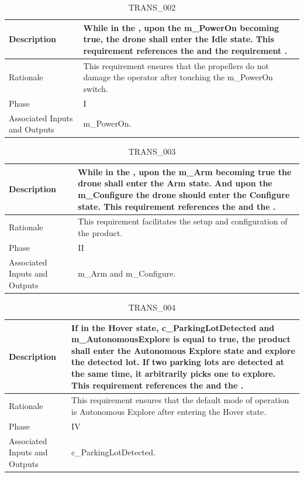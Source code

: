 \documentclass{article}
\begin{document}
\begin{table}[!h]
\begin{center}
\caption {TRANS\_002} 
\label{TRANS_002}
\begin{tabular}{ | m{3cm} | m{11cm} | }
\hline
Description & While in the \nameref{Off State}, upon the m\_PowerOn becoming true, the drone shall enter the Idle state. This requirement references the \nameref{Idle State} and the requirement \nameref{SAFE_005}. \\
\hline
Rationale & This requirement ensures that the propellers do not damage the operator after touching the m\_PowerOn switch.  \\
\hline
Phase & I \\
\hline
Associated Inputs and Outputs & m\_PowerOn. \\
\hline
\end{tabular}
\end{center}
\end{table}

\begin{table}[!h]
\begin{center}
\caption {TRANS\_003} 
\label{TRANS_003}
\begin{tabular}{ | m{3cm} | m{11cm} | }
\hline
Description & While in the \nameref{Idle State}, upon the m\_Arm becoming true the drone shall enter the Arm state. And upon the m\_Configure the drone should enter the Configure state. This requirement references the \nameref{Arm State} and the \nameref{Configure State}. \\
\hline
Rationale & This requirement facilitates the setup and configuration of the product.  \\
\hline
Phase & II \\
\hline
Associated Inputs and Outputs & m\_Arm and m\_Configure. \\
\hline
\end{tabular}
\end{center}
\end{table}

\begin{table}[!h]
\begin{center}
\caption {TRANS\_004} 
\label{TRANS_004}
\begin{tabular}{ | m{3cm} | m{11cm} | }
\hline
Description & If in the Hover state, c\_ParkingLotDetected and m\_AutonomousExplore is equal to true, the product shall enter the Autonomous Explore state and explore the detected lot. If two parking lots are detected at the same time, it arbitrarily picks one to explore. This requirement references the \nameref{Hover State} and the \nameref{Autonomous Explore State}. \\
\hline
Rationale & This requirement ensures that the default mode of operation is Autonomous Explore after entering the Hover state.  \\
\hline
Phase & IV \\
\hline
Associated Inputs and Outputs & c\_ParkingLotDetected. \\
\hline
\end{tabular}
\end{center}
\end{table}
\end{document}
